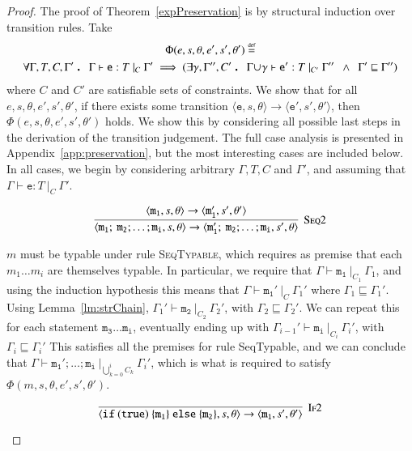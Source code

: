 \documentclass[12pt,a4paper,twoside,openright]{report}
\theoremstyle{definition}
\theoremstyle{dotless}
\newcommand{\transition}[6]{\langle{}\mathtt{#1},#2,#3\rangle{}\rightarrow{}\langle{}\mathtt{#4},#5,#6\rangle}
\newcommand\eqdef{\mathrel{\overset{\makebox[0pt]{\mbox{\normalfont\tiny def}}}{=}}}
\newcommand\qdot{\mathbin{\scalebox{1.5}{.}}\enspace}
\begin{document}
\begin{proof}
  The proof of Theorem~\ref{expPreservation} is by structural induction over transition rules.
  Take 
  \begin{multline*}
	\Phi(e, s, \theta, e', s', \theta') \eqdef   \\
	\forall\Gamma,T,C,\Gamma' \qdot
	\Gamma\vdash\mathtt{e}:T\ |_C\ \Gamma' \implies (\exists\gamma,\Gamma'',C'\qdot
    \Gamma\!\cup\!\gamma\vdash \mathtt{e'}:T\ |_{C'}\ \Gamma'' 
	\enspace\land\enspace \Gamma'\sqsubseteq\Gamma'')
  \end{multline*} 
  where $C$ and $C'$ are satisfiable sets of constraints. We show that for
  all $e, s, \theta, e', s', \theta'$, if there exists some transition
  $\transition{e}{s}{\theta}{e'}{s'}{\theta'}$, then
  $\Phi(e,s,\theta,e',s',\theta')$ holds. We show this by considering all
  possible last steps in the derivation of the transition judgement. The full
  case analysis is presented in Appendix~\ref{app:preservation}, but the most
  interesting cases are included below. In all cases, we begin by considering
  arbitrary $\Gamma, T, C$ and $\Gamma'$, and assuming that $\Gamma\vdash\mathtt{e}:T\ |_C\ \Gamma'$.
	
  \begin{case}[Seq2]
	$$\infer[\textsc{Seq2}]{
	  \transition{m_1;\ m_2; \dots; m_i}{s}{\theta}{m_1';\ m_2; \dots; m_i}{s'}{\theta}
	}{
	 \transition{m_1}{s}{\theta}{m_1'}{s'}{\theta'} 
	}$$

	$m$ must be typable under rule \textsc{SeqTypable}, which requires as
	premise that each $m_1\dots m_i$ are themselves typable. In particular, we
	require that $\Gamma\vdash\mathtt{m_1}\ |_{C_1}\ \Gamma_1$, and using the
	induction hypothesis this means that $\Gamma\vdash\mathtt{m_1'}\ |_{C}\
	\Gamma_1'$ where $\Gamma_1\sqsubseteq\Gamma_1'$. Using
	Lemma~\ref{lm:strChain}, $\Gamma_1'\vdash\mathtt{m_2}\ |_{C_2}\ \Gamma_2'$,
	with $\Gamma_2\sqsubseteq\Gamma_2'$. We can repeat this for each statement
	$\mathtt{m_3\dots m_i}$, eventually ending up with
	$\Gamma_{i-1}'\vdash\mathtt{m_i}\ |_{C_i}\ \Gamma_i'$, with
	$\Gamma_i\sqsubseteq\Gamma_i'$ This satisfies all the premises for rule
	SeqTypable, and we can conclude that $\Gamma\vdash\mathtt{m_1'; \dots;
	  m_i}\ |_{\bigcup_{k=0}^i{C_k}}\ \Gamma_i'$, which is what is required to
	satisfy $\Phi(m,s,\theta,e',s',\theta')$.
  
  \end{case}

  \begin{case}[If2]
	$$\infer[\textsc{If2}]{
	  \transition{if\ (true)\ \{m_1\}\ else\ \{m_2\}}{s}{\theta}{m_1}{s'}{\theta'}
	}{}$$


\end{case}
\end{proof}
\end{document}
